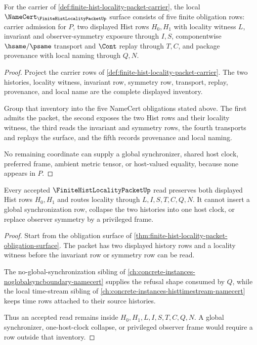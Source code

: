 \begin{theorem}
\label{thm:finite-hist-locality-packet-obligation-surface}
For the carrier of \autoref{def:finite-hist-locality-packet-carrier}, the local $\NameCert_{\FiniteHistLocalityPacketUp}$ surface consists of five finite obligation rows: carrier admission for $P$, two displayed Hist rows $H_0,H_1$ with locality witness $L$, invariant and observer-symmetry exposure through $I,S$, componentwise $\hsame/\psame$ transport and $\Cont$ replay through $T,C$, and package provenance with local naming through $Q,N$.
\end{theorem}
\begin{proof}
Project the carrier rows of \autoref{def:finite-hist-locality-packet-carrier}. The two histories, locality witness, invariant row, symmetry row, transport, replay, provenance, and local name are the complete displayed inventory.

Group that inventory into the five NameCert obligations stated above. The first admits the packet, the second exposes the two Hist rows and their locality witness, the third reads the invariant and symmetry rows, the fourth transports and replays the surface, and the fifth records provenance and local naming.

No remaining coordinate can supply a global synchronizer, shared host clock, preferred frame, ambient metric tensor, or host-valued equality, because none appears in $P$.
\end{proof}

\begin{theorem}
\label{thm:finite-hist-locality-packet-no-global-sync-refusal}
Every accepted $\FiniteHistLocalityPacketUp$ read preserves both displayed Hist rows $H_0,H_1$ and routes locality through $L,I,S,T,C,Q,N$. It cannot insert a global synchronization row, collapse the two histories into one host clock, or replace observer symmetry by a privileged frame.
\end{theorem}
\begin{proof}
Start from the obligation surface of \autoref{thm:finite-hist-locality-packet-obligation-surface}. The packet has two displayed history rows and a locality witness before the invariant row or symmetry row can be read.

The no-global-synchronization sibling of \autoref{ch:concrete-instances-noglobalsyncboundary-namecert} supplies the refusal shape consumed by $Q$, while the local time-stream sibling of \autoref{ch:concrete-instances-histtimestream-namecert} keeps time rows attached to their source histories.

Thus an accepted read remains inside $H_0,H_1,L,I,S,T,C,Q,N$. A global synchronizer, one-host-clock collapse, or privileged observer frame would require a row outside that inventory.
\end{proof}

